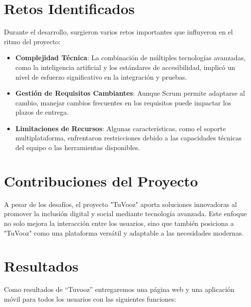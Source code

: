 \documentclass[12pt, a4paper, twocolumn]{article}
\begin{document}
\section*{Retos Identificados}
Durante el desarrollo, surgieron varios retos importantes que influyeron en el ritmo del proyecto:
\begin{itemize}
    \item \textbf{Complejidad Técnica}: La combinación de múltiples tecnologías avanzadas, como la inteligencia artificial y los estándares de accesibilidad, implicó un nivel de esfuerzo significativo en la integración y pruebas.
    \item \textbf{Gestión de Requisitos Cambiantes}: Aunque Scrum permite adaptarse al cambio, manejar cambios frecuentes en los requisitos puede impactar los plazos de entrega.
    \item \textbf{Limitaciones de Recursos}: Algunas características, como el soporte multiplataforma, enfrentaron restricciones debido a las capacidades técnicas del equipo o las herramientas disponibles.
\end{itemize}

\section*{Contribuciones del Proyecto}
A pesar de los desafíos, el proyecto "TuVooz" aporta soluciones innovadoras al promover la inclusión digital y social mediante tecnología avanzada. Este enfoque no solo mejora la interacción entre los usuarios, sino que también posiciona a "TuVooz" como una plataforma versátil y adaptable a las necesidades modernas.

\section*{Resultados}

Como resultados de “Tuvooz” entregaremos una página web y una aplicación móvil para todos los usuarios con las siguientes funciones:
\end{document}
